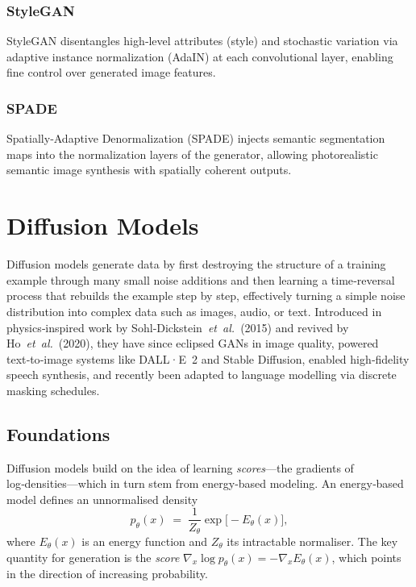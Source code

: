\documentclass{article}
\begin{document}
\subsubsection{StyleGAN}
StyleGAN disentangles high‑level attributes (style) and stochastic variation via adaptive instance normalization (AdaIN) at each convolutional layer, enabling fine control over generated image features.

\subsubsection{SPADE}
Spatially‑Adaptive Denormalization (SPADE) injects semantic segmentation maps into the normalization layers of the generator, allowing photorealistic semantic image synthesis with spatially coherent outputs.

\clearpage\newpage

\section{Diffusion Models}\label{sec:diffusion}

Diffusion models generate data by first destroying the structure of a training example through many small noise additions and then learning a time‑reversal process that rebuilds the example step by step, effectively turning a simple noise distribution into complex data such as images, audio, or text.  Introduced in physics‑inspired work by Sohl‑Dickstein \textit{et al.}\ (2015) and revived by Ho \textit{et al.}\ (2020), they have since eclipsed GANs in image quality, powered text‑to‑image systems like DALL·E 2 and Stable Diffusion, enabled high‑fidelity speech synthesis, and recently been adapted to language modelling via discrete masking schedules.

\subsection{Foundations}
Diffusion models build on the idea of learning \emph{scores}—the gradients of log‑densities—which in turn stem from energy‑based modeling.  An energy‑based model defines an unnormalised density
\[
  p_\theta(x) \;=\;\frac{1}{Z_\theta}\exp\bigl[-E_\theta(x)\bigr],
\]
where \(E_\theta(x)\) is an energy function and \(Z_\theta\) its intractable normaliser.  The key quantity for generation is the \emph{score} 
\(\nabla_x\log p_\theta(x) = -\nabla_x E_\theta(x)\), 
which points in the direction of increasing probability.
\end{document}
